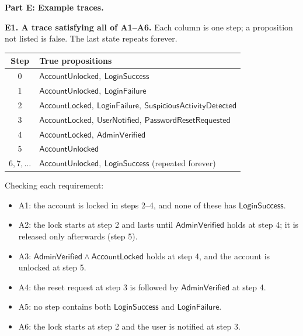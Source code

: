 \documentclass[a4paper, 11pt]{article}
\newcommand{\ap}[1]{\mathsf{#1}}
\newcommand{\LF}{\ap{LoginFailure}}
\newcommand{\LS}{\ap{LoginSuccess}}
\newcommand{\AL}{\ap{AccountLocked}}
\newcommand{\AU}{\ap{AccountUnlocked}}
\newcommand{\AV}{\ap{AdminVerified}}
\newcommand{\PR}{\ap{PasswordResetRequested}}
\newcommand{\UN}{\ap{UserNotified}}
\newcommand{\SA}{\ap{SuspiciousActivityDetected}}
\begin{document}
\begin{solution}
\bigskip
{}
\noindent\textbf{Part E: Example traces.}

\medskip
\noindent\textbf{E1. A trace satisfying all of A1--A6.}
Each column is one step; a proposition not listed is false. The last state repeats forever.
\begin{center}
\begin{tabular}{c|l}
\hline
Step & True propositions \\
\hline
0 & $\AU,\ \LS$ \\
1 & $\AU,\ \LF$ \\
2 & $\AL,\ \LF,\ \SA$ \\
3 & $\AL,\ \UN,\ \PR$ \\
4 & $\AL,\ \AV$ \\
5 & $\AU$ \\
$6,7,\dots$ & $\AU,\ \LS$ (repeated forever) \\
\hline
\end{tabular}
\end{center}
Checking each requirement:
\begin{itemize}
    \item A1: the account is locked in steps 2--4, and none of these has $\LS$.
    \item A2: the lock starts at step 2 and lasts until $\AV$ holds at step 4; it is released only afterwards (step 5).
    \item A3: $\AV\wedge\AL$ holds at step 4, and the account is unlocked at step 5.
    \item A4: the reset request at step 3 is followed by $\AV$ at step 4.
    \item A5: no step contains both $\LS$ and $\LF$.
    \item A6: the lock starts at step 2 and the user is notified at step 3.
\end{itemize}


\end{solution}
\end{document}
